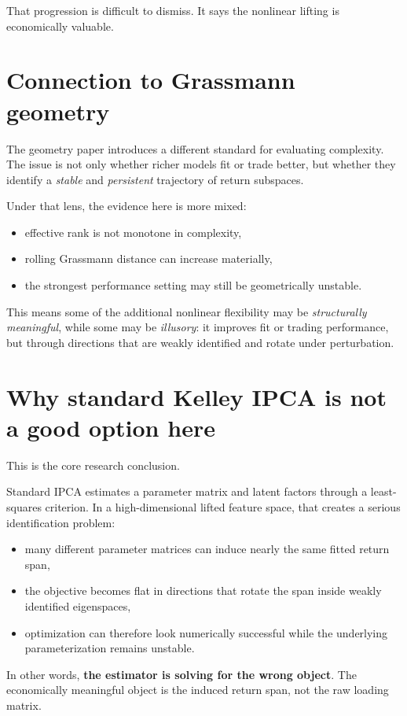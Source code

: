 \documentclass[11pt]{article}
\begin{document}
That progression is difficult to dismiss. It says the nonlinear lifting is economically valuable.

\section{Connection to Grassmann geometry}

The geometry paper introduces a different standard for evaluating complexity.
The issue is not only whether richer models fit or trade better, but whether they identify a \emph{stable} and \emph{persistent}
trajectory of return subspaces.

Under that lens, the evidence here is more mixed:
\begin{itemize}
    \item effective rank is not monotone in complexity,
    \item rolling Grassmann distance can increase materially,
    \item the strongest performance setting may still be geometrically unstable.
\end{itemize}

This means some of the additional nonlinear flexibility may be \emph{structurally meaningful}, while some may be \emph{illusory}:
it improves fit or trading performance, but through directions that are weakly identified and rotate under perturbation.

\section{Why standard Kelley IPCA is not a good option here}

This is the core research conclusion.

Standard IPCA estimates a parameter matrix and latent factors through a least-squares criterion. In a high-dimensional lifted feature space,
that creates a serious identification problem:
\begin{itemize}
    \item many different parameter matrices can induce nearly the same fitted return span,
    \item the objective becomes flat in directions that rotate the span inside weakly identified eigenspaces,
    \item optimization can therefore look numerically successful while the underlying parameterization remains unstable.
\end{itemize}

In other words, \textbf{the estimator is solving for the wrong object}. The economically meaningful object is the induced return span,
not the raw loading matrix.
\end{document}
